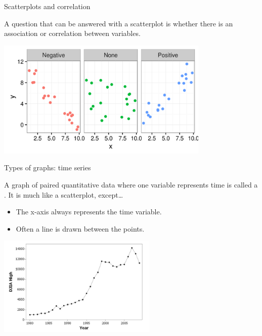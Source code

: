 \documentclass[xcolor=table, aspectratio=169, bigger]{beamer}
\begin{document}
\begin{frame}{Scatterplots and correlation}
\begin{block}{}
\large
A question that can be answered with a scatterplot is whether there is an association or correlation between variables.  
\end{block}

\bigskip
{\centering
\includegraphics[width=4in]{../images/wk04_scatter_cor}
\par}
\end{frame}

\begin{frame}{Types of graphs: time series}
\begin{block}{}
A graph of paired quantitative data where one variable represents time is called a . It is much like a scatterplot, except\ldots
\begin{itemize}
\item The x-axis always represents the time variable.
\item Often a line is drawn between the points.
\end{itemize}
\end{block}
\bigskip
{\centering
\includegraphics[width=3in]{../images/wk04_timeseries}
\par}

\end{frame}
\end{document}
